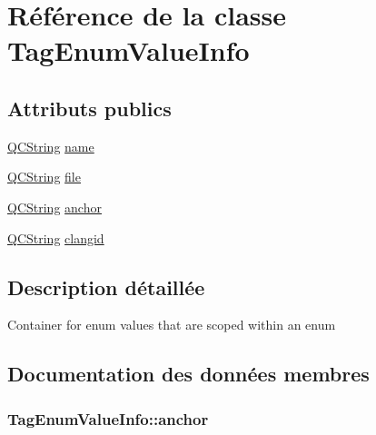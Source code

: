 \hypertarget{class_tag_enum_value_info}{}\section{Référence de la classe Tag\+Enum\+Value\+Info}
\label{class_tag_enum_value_info}
\subsection*{Attributs publics}
\begin{DoxyCompactItemize}
\item 
\hyperlink{class_q_c_string}{Q\+C\+String} \hyperlink{class_tag_enum_value_info_a39757957cc24cb10975e073b3f32d6c9}{name}
\item 
\hyperlink{class_q_c_string}{Q\+C\+String} \hyperlink{class_tag_enum_value_info_a5f25892dd8fae1bb87c645397a5152f0}{file}
\item 
\hyperlink{class_q_c_string}{Q\+C\+String} \hyperlink{class_tag_enum_value_info_aac9535c84841d7b352e0bc9da1095a6f}{anchor}
\item 
\hyperlink{class_q_c_string}{Q\+C\+String} \hyperlink{class_tag_enum_value_info_ab5084426052301a148357fde91974253}{clangid}
\end{DoxyCompactItemize}


\subsection{Description détaillée}
Container for enum values that are scoped within an enum 

\subsection{Documentation des données membres}
\hypertarget{class_tag_enum_value_info_aac9535c84841d7b352e0bc9da1095a6f}{}
\subsubsection[{anchor}]{ Tag\+Enum\+Value\+Info\+::anchor}\label{class_tag_enum_value_info_aac9535c84841d7b352e0bc9da1095a6f}
\hypertarget{class_tag_enum_value_info_ab5084426052301a148357fde91974253}{}
